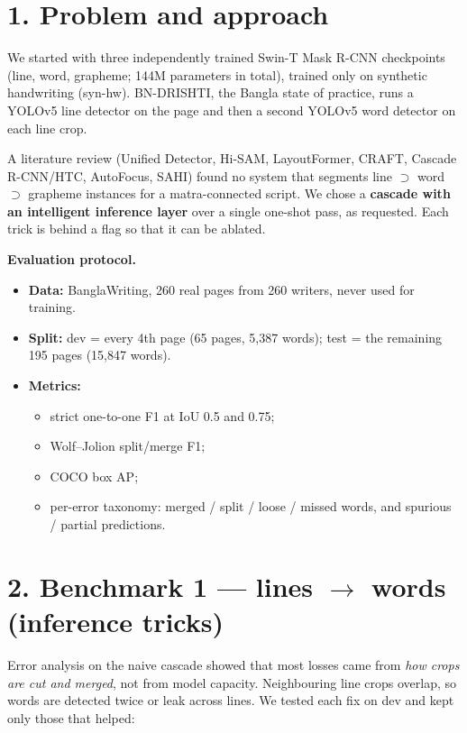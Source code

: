 \documentclass[10.5pt,a4paper]{article}
\begin{document}
\section*{1. Problem and approach}
We started with three independently trained Swin-T Mask R-CNN checkpoints (line, word, grapheme;
144M parameters in total), trained only on synthetic handwriting (syn-hw). BN-DRISHTI, the Bangla state
of practice, runs a YOLOv5 line detector on the page and then a second YOLOv5 word detector on each
line crop.

A literature review (Unified Detector, Hi-SAM, LayoutFormer, CRAFT, Cascade R-CNN/HTC, AutoFocus,
SAHI) found no system that segments line $\supset$ word $\supset$ grapheme instances for a
matra-connected script. We chose a \textbf{cascade with an intelligent inference layer} over a single
one-shot pass, as requested. Each trick is behind a flag so that it can be ablated.

\textbf{Evaluation protocol.}
\begin{itemize}
  \item \textbf{Data:} BanglaWriting, 260 real pages from 260 writers, never used for training.
  \item \textbf{Split:} dev = every 4th page (65 pages, 5{,}387 words); test = the remaining 195 pages
        (15{,}847 words).
  \item \textbf{Metrics:}
    \begin{itemize}
      \item strict one-to-one F1 at IoU 0.5 and 0.75;
      \item Wolf--Jolion split/merge F1;
      \item COCO box AP;
      \item per-error taxonomy: merged / split / loose / missed words, and spurious / partial
            predictions.
    \end{itemize}
\end{itemize}

\section*{2. Benchmark 1 --- lines $\rightarrow$ words (inference tricks)}
Error analysis on the naive cascade showed that most losses came from \emph{how crops are cut and
merged}, not from model capacity. Neighbouring line crops overlap, so words are detected twice or
leak across lines. We tested each fix on dev and kept only those that helped:
\end{document}
